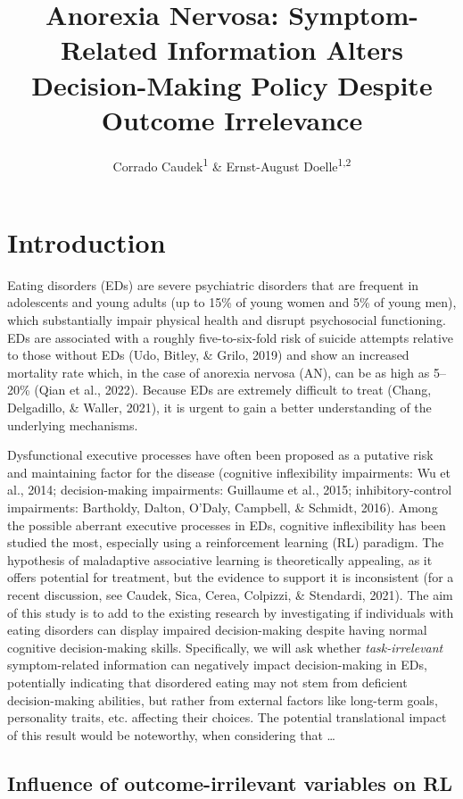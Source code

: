 \documentclass[
  man,floatsintext]{apa6}
\title{Anorexia Nervosa: Symptom-Related Information Alters Decision-Making Policy Despite Outcome Irrelevance}
\author{Corrado Caudek\textsuperscript{1} \& Ernst-August Doelle\textsuperscript{1,2}}
\date{}
\affiliation{\vspace{0.5cm}\textsuperscript{1} Wilhelm-Wundt-University\\\textsuperscript{2} Konstanz Business School}
\begin{document}
\maketitle

\hypertarget{introduction}{%
\section{Introduction}\label{introduction}}

Eating disorders (EDs) are severe psychiatric disorders that are frequent in adolescents and young adults (up to 15\% of young women and 5\% of young men), which substantially impair physical health and disrupt psychosocial functioning. EDs are associated with a roughly five-to-six-fold risk of suicide attempts relative to those without EDs (Udo, Bitley, \& Grilo, 2019) and show an increased mortality rate which, in the case of anorexia nervosa (AN), can be as high as 5--20\% (Qian et al., 2022). Because EDs are extremely difficult to treat (Chang, Delgadillo, \& Waller, 2021), it is urgent to gain a better understanding of the underlying mechanisms.

Dysfunctional executive processes have often been proposed as a putative risk and
maintaining factor for the disease (cognitive inflexibility impairments: Wu et al., 2014; decision-making impairments: Guillaume et al., 2015; inhibitory-control impairments: Bartholdy, Dalton, O'Daly, Campbell, \& Schmidt, 2016). Among the possible aberrant executive processes in EDs, cognitive inflexibility has been studied the most, especially using a reinforcement learning (RL) paradigm. The hypothesis of maladaptive associative learning is theoretically appealing, as it offers potential for treatment, but the evidence to support it is inconsistent (for a recent discussion, see Caudek, Sica, Cerea, Colpizzi, \& Stendardi, 2021). The aim of this study is to add to the existing research by investigating if individuals with eating disorders can display impaired decision-making despite having normal cognitive decision-making skills. Specifically, we will ask whether \emph{task-irrelevant} symptom-related information can negatively impact decision-making in EDs, potentially indicating that disordered eating may not stem from deficient decision-making abilities, but rather from external factors like long-term goals, personality traits, etc. affecting their choices. The potential translational impact of this result would be noteworthy, when considering that \ldots{}

\hypertarget{influence-of-outcome-irrilevant-variables-on-rl}{%
\subsection{Influence of outcome-irrilevant variables on RL}\label{influence-of-outcome-irrilevant-variables-on-rl}}
\end{document}
